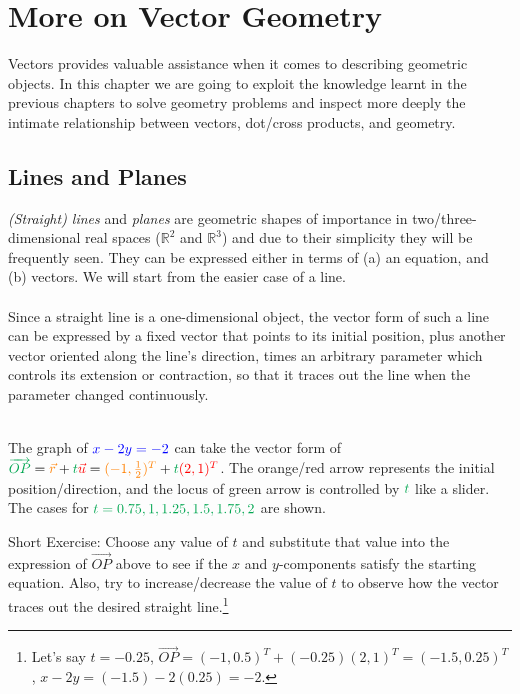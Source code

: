 \chapter{More on Vector Geometry}

Vectors provides valuable assistance when it comes to describing geometric objects. In this chapter we are going to exploit the knowledge learnt in the previous chapters to solve geometry problems and inspect more deeply the intimate relationship between vectors, dot/cross products, and geometry.

\section{Lines and Planes}
\textit{(Straight) lines} and \textit{planes} are geometric shapes of importance in two/three-dimensional real spaces ($\mathbb{R}^2$ and $\mathbb{R}^3$) and due to their simplicity they will be frequently seen. They can be expressed either in terms of (a) an equation, and (b) vectors. We will start from the easier case of a line.\\
\\
Since a straight line is a one-dimensional object, the vector form of such a line can be expressed by a fixed vector that points to its initial position, plus another vector oriented along the line's direction, times an arbitrary parameter which controls its extension or contraction, so that it traces out the line when the parameter changed continuously.
\begin{center}
\\
The graph of $\color{blue}x - 2y = -2$ can take the vector form of ${\color{Green}\overrightarrow{OP}} = {\color{orange}\vec{r}} + {\color{Green}t} {\color{red}\vec{u}} = {\color{orange}(-1,\frac{1}{2})^T} + {\color{Green}t}{\color{red}(2,1)^T}$. The orange/red arrow represents the initial position/direction, and the locus of green arrow is controlled by $\color{Green}t$ like a slider. The cases for $\color{Green}t = 0.75, 1, 1.25, 1.5, 1.75, 2$ are shown.
\end{center}
Short Exercise: Choose any value of $t$ and substitute that value into the expression of $\overrightarrow{OP}$ above to see if the $x$ and $y$-components satisfy the starting equation. Also, try to increase/decrease the value of $t$ to observe how the vector traces out the desired straight line.\footnote{Let's say $t = -0.25$, $\overrightarrow{OP}=(-1,0.5)^T + (-0.25)(2,1)^T = (-1.5, 0.25)^T$, $x - 2y = (-1.5) - 2(0.25) = -2$.}

